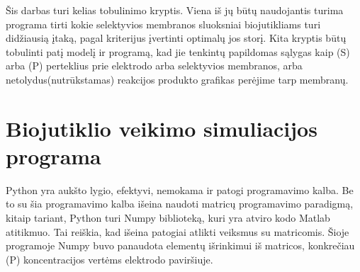 \documentclass[12pt, a4paper, lithuanian]{article}
\begin{document}
Šis darbas turi kelias tobulinimo kryptis. Viena iš jų būtų naudojantis turima
programa tirti kokie selektyvios membranos sluoksniai biojutikliams
turi didžiausią įtaką, pagal kriterijus įvertinti optimalų jos storį. Kita
kryptis būtų tobulinti patį modelį ir programą, kad jie tenkintų papildomas
sąlygas kaip (S) arba (P) perteklius prie elektrodo arba selektyvios membranos,
arba netolydus(nutrūkstamas) reakcijos produkto grafikas perėjime tarp
membranų. 

 
% 
% 
% 




\appendix

\section{Biojutiklio veikimo simuliacijos programa}
\label{programa}
Python yra aukšto lygio, efektyvi, nemokama ir patogi programavimo kalba.
Be to su šia programavimo kalba išeina naudoti matricų programavimo paradigmą,
kitaip tariant, Python turi Numpy biblioteką, kuri yra atviro kodo Matlab
atitikmuo. Tai reiškia, kad išeina patogiai atlikti veiksmus su matricomis.
Šioje programoje Numpy buvo panaudota elementų išrinkimui iš matricos,
konkrečiau (P) koncentracijos vertėms elektrodo paviršiuje.
\end{document}
